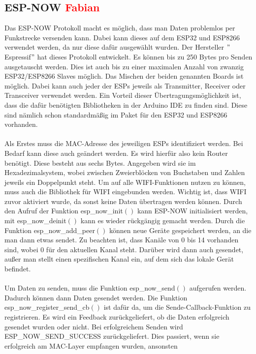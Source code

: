 \documentclass[titlepage,12pt,twoside]{article}
\begin{document}
\subsection{ESP-NOW \textcolor{red}{Fabian}}
Das ESP-NOW Protokoll macht es möglich, dass man Daten problemlos per 
Funkstrecke versenden kann. Dabei kann dieses auf dem ESP32 und ESP8266 
verwendet werden, da nur diese dafür ausgewählt wurden. Der Hersteller 
$"$Espressif$"$ hat dieses Protokoll entwickelt. Es können bis zu 250 Bytes 
pro Senden ausgetauscht werden. Dies ist auch bis zu einer maximalen Anzahl 
von zwanzig ESP32/ESP8266 Slaves möglich. Das Mischen der beiden genannten 
Boards ist möglich. Dabei kann auch jeder der ESPs jeweils als Transmitter, 
Receiver oder Transceiver verwendet werden. Ein Vorteil dieser Übertragungsmöglichkeit 
ist, dass die dafür benötigten Bibliotheken in der Arduino IDE zu finden 
sind. Diese sind nämlich schon standardmäßig im Paket für den ESP32 und 
ESP8266 vorhanden. \\
\\
Als Erstes muss die MAC-Adresse des jeweiligen ESPs identifiziert werden. 
Bei Bedarf kann diese auch geändert werden. Es wird hierfür also kein 
Router benötigt. Diese besteht aus sechs Bytes. Angegeben wird sie im 
Hexadezimalsystem, wobei zwischen Zweierblöcken von Buchstaben und Zahlen 
jeweils ein Doppelpunkt steht. Um auf alle WIFI-Funktionen nutzen zu können, 
muss auch die Bibliothek für WIFI eingebunden werden. Wichtig ist, dass WIFI 
zuvor aktiviert wurde, da sonst keine Daten übertragen werden können. Durch 
den Aufruf der Funktion esp\_now\_init$()$ kann ESP-NOW initialisiert werden, 
mit esp\_now\_deinit$()$ kann es wieder rückgängig gemacht werden. Durch die 
Funktion esp\_now\_add\_peer$()$ können neue Geräte gespeichert werden, an die 
man dann etwas sendet. Zu beachten ist, dass Kanäle von 0 bis 14 vorhanden 
sind, wobei 0 für den aktuellen Kanal steht. Darüber wird dann auch gesendet, 
außer man stellt einen spezifischen Kanal ein, auf dem sich das lokale Gerät 
befindet. \\
\\
Um Daten zu senden, muss die Funktion esp\_now\_send$()$ aufgerufen werden. 
Dadurch können dann Daten gesendet werden. Die Funktion esp\_now\_register\_send\_cb$()$ 
ist dafür da, um die Sende-Callback-Funktion zu registrieren. Es wird ein 
Feedback zurückgeliefert, ob die Daten erfolgreich gesendet wurden oder 
nicht. Bei erfolgreichem Senden wird ESP\_NOW\_SEND\_SUCCESS zurückgeliefert. 
Dies passiert, wenn sie erfolgreich am MAC-Layer empfangen wurden, ansonsten 
\end{document}
